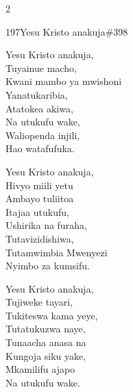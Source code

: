 \begin{multicols}{2}
\begin{hymn}{197}{Yesu Kristo anakuja}{\#398}
\begin{stanza}
Yesu Kristo anakuja,\\
Tuyainue macho,\\
Kwani mambo ya mwishoni\\
Yanatukaribia,\\
Atatokea akiwa,\\
Na utukufu wake,\\
Waliopenda injili,\\
Hao watafufuka.
\end{stanza}
\begin{stanza}
Yesu Kristo anakuja,\\
Hivyo miili yetu\\
Ambayo tuliitoa\\
Itajaa utukufu,\\
Ushirika na furaha,\\
Tutavizidishiwa,\\
Tutamwimbia Mwenyezi\\
Nyimbo za kumsifu.
\end{stanza}
\begin{stanza}
Yesu Kristo anakuja,\\
Tujiweke tayari,\\
Tukiteswa kama yeye,\\
Tutatukuzwa naye,\\
Tunaacha anasa na\\
Kungoja siku yake,\\
Mkamilifu ajapo\\
Na utukufu wake.
\end{stanza}
\end{hymn}


\end{multicols}
